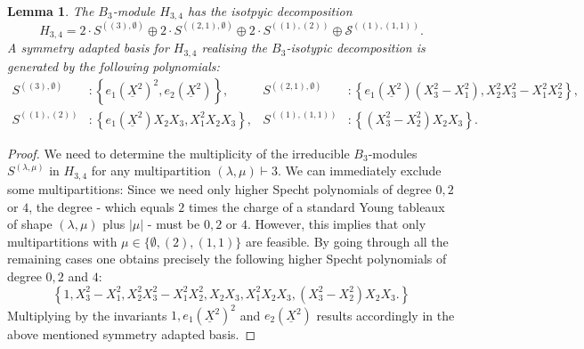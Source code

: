 \documentclass[11pt,a4paper]{amsart}
\numberwithin{equation}{section}
\newtheorem{lemma}[thm]{Lemma}
\theoremstyle{definition}
\numberwithin{thm}{section}
\theoremstyle{break}
\numberwithin{subcase}{case}
\begin{document}
\begin{lemma}\label{lemma:Harris}
The $B_3$-module $H_{3,4}$ has the isotpyic decomposition \[ H_{3,4} = 2 \cdot {S}^{((3),\emptyset)} \oplus 2 \cdot {S}^{((2,1),\emptyset)} \oplus 2 \cdot {S}^{((1),(2))} \oplus \mathcal{S}^{((1),(1,1))}. \]
A symmetry adapted basis for $H_{3,4}$ realising the $B_3$-isotypic decomposition is generated by the following polynomials:
\begin{align*}
    S^{((3),\emptyset)} & :  \left\{e_1(\underline{X}^2)^2,e_2(\underline{X}^2)\right\}, &
    S^{((2,1),\emptyset)} & :  \left\{e_1(\underline{X}^2)(X_3^2-X_1^2), X_2^2X_3^2-X_1^2X_2^2 \right\}, \\
    S^{((1),(2))} & : \left\{e_1(\underline{X}^2)X_2X_3, X_1^2X_2X_3\right\}, &
    S^{((1),(1,1))} & :  \left\{(X_3^2-X_2^2)X_2X_3\right\}.
\end{align*}
\end{lemma}
\begin{proof}
We need to determine the multiplicity of the irreducible $B_3$-modules $S^{(\lambda,\mu)}$ in $H_{3,4}$ for any multipartition $(\lambda,\mu) \vdash 3$. We can immediately exclude some multipartitions: Since we need only higher Specht polynomials of degree $0,2$ or $4$, the degree - which equals $2$ times the charge of a standard Young tableaux of shape $(\lambda,\mu)$ plus $|\mu|$ - must be $0,2$ or $4$. However, this implies that only multipartitions with $\mu \in \{ \emptyset, (2),(1,1)\}$ are feasible. By going through all the remaining cases one obtains precisely the following higher Specht polynomials of degree $0,2$ and $4$:
$$\left\{1, X_3^2-X_1^2, X_2^2X_3^2-X_1^2X_2^2, 
X_2X_3,X_1^2X_2X_3,(X_3^2-X_2^2)X_2X_3.\right\}$$
Multiplying by the invariants $1, e_1(\underline{X}^2)^2$ and $e_2(\underline{X}^2)$ results accordingly in the above mentioned symmetry adapted basis.
\end{proof}
\end{document}
